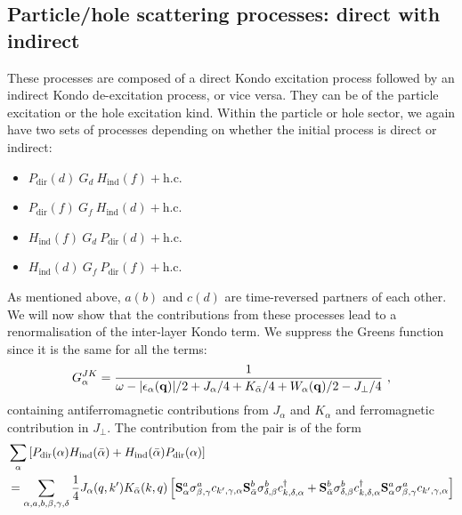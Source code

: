 \subsection{Particle/hole scattering processes: direct with indirect}
These processes are composed of a direct Kondo excitation process followed by an indirect Kondo de-excitation process, or vice versa. They can be of the particle excitation or the hole excitation kind. Within the particle or hole sector, we again have two sets of processes depending on whether the initial process is direct or indirect:
\begin{itemize}
	\item[a.] \(P_\text{dir}(d)~G_{d}~H_\text{ind}(f) + \text{h.c.}\)
	\item[b.] \(P_\text{dir}(f)~G_{f}~H_\text{ind}(d) + \text{h.c.}\)
	\item[c.] \(H_\text{ind}(f)~G_{d}~P_\text{dir}(d) + \text{h.c.}\)
	\item[d.] \(H_\text{ind}(d)~G_{f}~P_\text{dir}(f) + \text{h.c.}\)
\end{itemize}
As mentioned above, \(a (b)\) and \(c (d)\) are time-reversed partners of each other. We will now show that the contributions from these processes lead to a renormalisation of the inter-layer Kondo term. We suppress the Greens function since it is the same for all the terms:
\begin{equation}\begin{aligned}
	G^{JK}_\alpha = \frac{1}{\omega - |\epsilon_\alpha({\bf q})| / 2 + J_\alpha/4 + K_{\bar\alpha}/4 + W_\alpha({\bf q})/2 - J_\perp / 4}~,
\end{aligned}\end{equation}
containing antiferromagnetic contributions from \(J_\alpha\) and \(K_\alpha\) and ferromagnetic contribution in \(J_\perp\).
The contribution from the pair is of the form
\begin{equation}\begin{aligned}
	&\sum_\alpha \left[P_\text{dir}(\alpha)H_\text{ind}(\bar\alpha) + H_\text{ind}(\bar\alpha)P_\text{dir}(\alpha)\right] \\
	&= \sum_{\alpha, a, b, \beta, \gamma, \delta}\frac{1}{4}J_\alpha(q, k^\prime) K_{\bar\alpha}(k, q)  \left[{\bf S}^a_\alpha \sigma^a_{\beta,\gamma} c_{k^\prime,\gamma,\alpha} {\bf S}^b_{\bar\alpha}\sigma^b_{\delta, \beta} c^\dagger_{k,\delta,\alpha} + {\bf S}^b_{\bar\alpha}\sigma^b_{\delta, \beta} c^\dagger_{k,\delta,\alpha}{\bf S}^a_\alpha \sigma^a_{\beta,\gamma} c_{k^\prime,\gamma,\alpha} \right]\\
\end{aligned}\end{equation}
